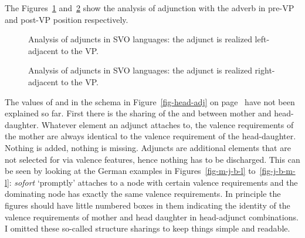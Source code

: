 The Figures~\ref{fig-adj-vp} and~\ref{fig-vp-adj} show the analysis of adjunction with the adverb in
pre-VP and post-VP position respectively.
\begin{figure}
\caption{\label{fig-adj-vp}Analysis of adjuncts in SVO languages: the adjunct is realized left-adjacent to the VP.}
\end{figure}
\begin{figure}
\caption{\label{fig-vp-adj}Analysis of adjuncts in SVO languages: the adjunct is realized right-adjacent to the VP.}
\end{figure}

The values of \spr and \comps in the schema in Figure~\ref{fig-head-adj} on
page~\pageref{fig-head-adj} have not been explained so far. First there is the sharing of the \spr
and \compsvs between mother and head-daughter. Whatever element an adjunct attaches to, the valence
requirements of the mother are always identical to the valence requirement of the
head-daughter. Nothing is added, nothing is missing. Adjuncts are additional elements that are not
selected for via valence features, hence nothing has to be discharged. This can be seen by looking
at the German examples in Figures~\ref{fig-m-j-b-l} to~\ref{fig-j-b-m-l}: \emph{sofort} `promptly'
attaches to a node with certain valence requirements and the dominating node has exactly the same
valence requirements. In principle the figures should have little numbered boxes in them indicating
the identity of the valence requirements of mother and head daughter in head-adjunct combinations. I
omitted these so-called structure sharings to keep things simple and readable. 

